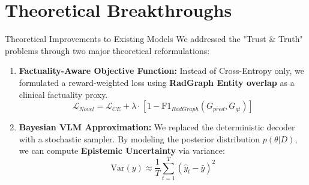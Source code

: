 \documentclass[aspectratio=169]{beamer}
\begin{document}
\section{Theoretical Breakthroughs}

\begin{frame}{Theoretical Improvements to Existing Models}
  We addressed the "Trust \& Truth" problems through two major theoretical reformulations:
  \vspace{0.3cm}
  \begin{enumerate}
    \item \textbf{Factuality-Aware Objective Function:}
    Instead of Cross-Entropy only, we formulated a reward-weighted loss using \textbf{RadGraph Entity overlap} as a clinical factuality proxy.
    \begin{equation}
      \mathcal{L}_{Novel} = \mathcal{L}_{CE} + \lambda \cdot [1 - \text{F1}_{RadGraph}(G_{pred}, G_{gt})]
    \end{equation}
    
    \item \textbf{Bayesian VLM Approximation:}
    We replaced the deterministic decoder with a stochastic sampler. By modeling the posterior distribution $p(\theta|D)$, we can compute \textbf{Epistemic Uncertainty} via variance:
    \begin{equation}
      \text{Var}(y) \approx \frac{1}{T} \sum_{t=1}^{T} (\hat{y}_t - \bar{y})^2
    \end{equation}
  \end{enumerate}
\end{frame}
\end{document}
